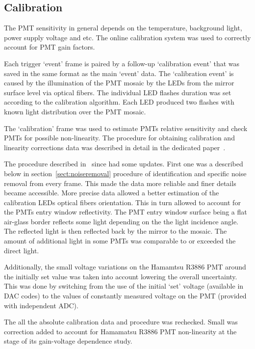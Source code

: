 \documentclass[final,5p,times,twocolumn]{elsarticle}
\begin{document}
\subsection{Calibration}
The PMT sensitivity in general depends on the temperature, background light, power supply voltage and etc. The online calibration system was used to correctly account for PMT gain factors.

Each trigger `event' frame is paired by a follow-up `calibration event' that was saved in the same format as the main `event' data. The `calibration event' is caused by the illumination of the PMT mosaic by the LEDs from the mirror surface level via optical fibers. The individual LED flashes duration was set according to the calibration algorithm. Each LED produced two flashes with known light distribution over the PMT mosaic. 

The `calibration' frame was used to estimate PMTs relative sensitivity and check PMTs for possible non-linearity. The procedure for obtaining calibration and linearity corrections data was described in detail in the dedicated paper~\cite{Ant16}. 

The procedure described in~\cite{Ant16} since had some updates. First one was a described below in section~\ref{sect:noiseremoval} procedure of identification and specific noise removal from every frame. This made the data more reliable and finer details became accessible. More precise data allowed a better estimation of the calibration LEDs optical fibers orientation. This in turn allowed to account for the PMTs entry window reflectivity. The PMT entry window surface being a flat air-glass border reflects some light depending on the the light incidence angle. The reflected light is then reflected back by the mirror to the mosaic. The amount of additional light in some PMTs was comparable to or exceeded the direct light.

Additionally, the small voltage variations on the Hamamtsu R3886 PMT around the initially set value was taken into account lowering the overall uncertainty. This was done by switching from the use of the initial `set' voltage (available in DAC codes) to the values of constantly measured voltage on the PMT (provided with independent ADC).

The all the absolute calibration data and procedure was rechecked. Small was correction added to account for Hamamatsu R3886 PMT non-linearity at the stage of its gain-voltage dependence study.
\end{document}

